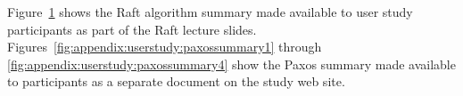 \begin{enumerate}
Figure~\ref{fig:appendix:userstudy:raftsummary} shows the Raft algorithm
summary made available to user study participants as part of the Raft lecture
slides.
Figures~\ref{fig:appendix:userstudy:paxossummary1} through
\ref{fig:appendix:userstudy:paxossummary4} show the Paxos summary made
available to participants as a separate document on the study web site.

\begin{figure}
\centering
{}
\vspace{-3ex}
\label{fig:appendix:userstudy:raftsummary}
\end{figure}



\end{enumerate}
